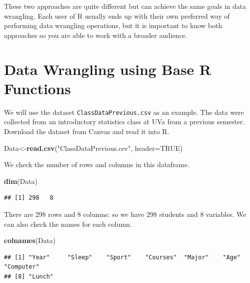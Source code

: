 \documentclass[
]{book}
\newenvironment{Shaded}{\begin{snugshade}}{\end{snugshade}}
\newcommand{\AttributeTok}[1]{\textcolor[rgb]{0.13,0.29,0.53}{#1}}
\newcommand{\ConstantTok}[1]{\textcolor[rgb]{0.56,0.35,0.01}{#1}}
\newcommand{\FunctionTok}[1]{\textcolor[rgb]{0.13,0.29,0.53}{\textbf{#1}}}
\newcommand{\NormalTok}[1]{#1}
\newcommand{\OtherTok}[1]{\textcolor[rgb]{0.56,0.35,0.01}{#1}}
\newcommand{\StringTok}[1]{\textcolor[rgb]{0.31,0.60,0.02}{#1}}
\begin{document}
These two approaches are quite different but can achieve the same goals in data wrangling. Each user of R usually ends up with their own preferred way of performing data wrangling operations, but it is important to know both approaches so you are able to work with a broader audience.

\hypertarget{data-wrangling-using-base-r-functions}{%
\section{Data Wrangling using Base R Functions}\label{data-wrangling-using-base-r-functions}}

We will use the dataset \texttt{ClassDataPrevious.csv} as an example. The data were collected from an introductory statistics class at UVa from a previous semester. Download the dataset from Canvas and read it into R.

\begin{Shaded}
\begin{Highlighting}[]
\NormalTok{Data}\OtherTok{\textless{}{-}}\FunctionTok{read.csv}\NormalTok{(}\StringTok{"ClassDataPrevious.csv"}\NormalTok{, }\AttributeTok{header=}\ConstantTok{TRUE}\NormalTok{)}
\end{Highlighting}
\end{Shaded}

We check the number of rows and columns in this dataframe.

\begin{Shaded}
\begin{Highlighting}[]
\FunctionTok{dim}\NormalTok{(Data)}
\end{Highlighting}
\end{Shaded}

\begin{verbatim}
## [1] 298   8
\end{verbatim}

There are 298 rows and 8 columns: so we have 298 students and 8 variables. We can also check the names for each column.

\begin{Shaded}
\begin{Highlighting}[]
\FunctionTok{colnames}\NormalTok{(Data)}
\end{Highlighting}
\end{Shaded}

\begin{verbatim}
## [1] "Year"     "Sleep"    "Sport"    "Courses"  "Major"    "Age"      "Computer"
## [8] "Lunch"
\end{verbatim}
\end{document}
